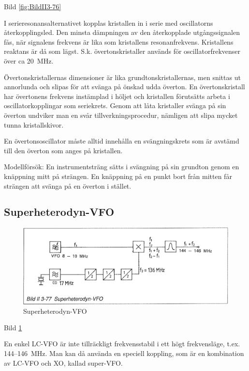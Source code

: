 Bild \ref{fig:BildII3-76}

I serieresonansalternativet kopplas kristallen in i serie med
oscillatorns återkopplingsled. Den minsta dämpningen av den
återkopplade utgångssignalen fås, när signalens frekvens är lika som
kristallens resonanfrekvens. Kristallens reaktans är då som
lägst. S.k. övertonskristaller används för oscillatorfrekvenser över
ca 20~MHz.

Övertonskristallernas dimensioner är lika grundtonskristallernas, men
snittas ut annorlunda och slipas för att svänga på önskad udda
överton. En övertonskristall har övertonens frekvens instämplad i
höljet och kristallen förutsätts arbeta i oscillatorkopplingar som
seriekrets. Genom att låta kristaller svänga på sin överton undviker
man en svår tillverkningsprocedur, nämligen att slipa mycket tunna
kristallskivor.

En övertonsoscillator måste alltid innehålla en svängningskrets som är
avstämd till den överton som anges på kristallen.

Modellförsök: En instrumentsträng sätts i svängning på sin grundton
genom en knäppning mitt på strängen. En knäppning på en punkt bort
från mitten får strängen att svänga på en överton i stället.

\subsection{Superheterodyn-VFO}

\begin{figure}
\includegraphics[width=\textwidth]{images/bild_2_3-77}
\caption{Superheterodyn-VFO}
\label{fig:BildII3-77}
\end{figure}

Bild \ref{fig:BildII3-77}

En enkel LC-VFO är inte tillräckligt frekvensstabil i ett högt
frekvensläge, t.ex. 144--146~MHz. Man kan då använda en speciell
koppling, som är en kombination av LC-VFO och XO, kallad super-VFO.

